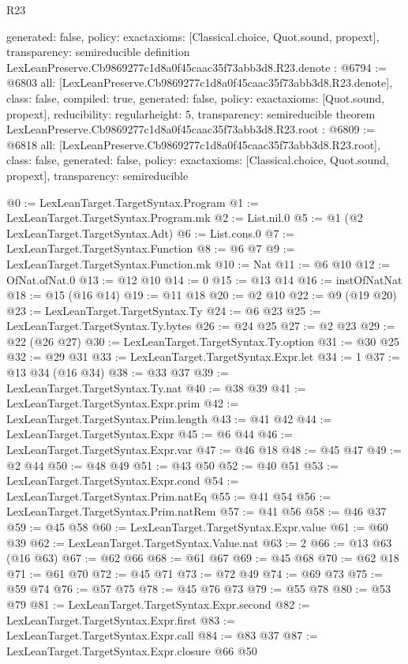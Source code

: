 \begin{lexlean}{R23}
\begin{coremodule}
{  generated: false,
  policy: exact{axioms: [Classical.choice, Quot.sound, propext]},
  transparency: semireducible
}
definition LexLeanPreserve.Cb9869277c1d8a0f45caac35f73abb3d8.R23.denote : @6794 := @6803 {
  all: [LexLeanPreserve.Cb9869277c1d8a0f45caac35f73abb3d8.R23.denote],
  class: false,
  compiled: true,
  generated: false,
  policy: exact{axioms: [Quot.sound, propext]},
  reducibility: regular{height: 5},
  transparency: semireducible
}
theorem LexLeanPreserve.Cb9869277c1d8a0f45caac35f73abb3d8.R23.root : @6809 := @6818 {
  all: [LexLeanPreserve.Cb9869277c1d8a0f45caac35f73abb3d8.R23.root],
  class: false,
  generated: false,
  policy: exact{axioms: [Classical.choice, Quot.sound, propext]},
  transparency: semireducible
}

@0 := LexLeanTarget.TargetSyntax.Program
@1 := LexLeanTarget.TargetSyntax.Program.mk
@2 := List.nil.{0}
@5 := @1 (@2 LexLeanTarget.TargetSyntax.Adt)
@6 := List.cons.{0}
@7 := LexLeanTarget.TargetSyntax.Function
@8 := @6 @7
@9 := LexLeanTarget.TargetSyntax.Function.mk
@10 := Nat
@11 := @6 @10
@12 := OfNat.ofNat.{0}
@13 := @12 @10
@14 := 0
@15 := @13 @14
@16 := instOfNatNat
@18 := @15 (@16 @14)
@19 := @11 @18
@20 := @2 @10
@22 := @9 (@19 @20)
@23 := LexLeanTarget.TargetSyntax.Ty
@24 := @6 @23
@25 := LexLeanTarget.TargetSyntax.Ty.bytes
@26 := @24 @25
@27 := @2 @23
@29 := @22 (@26 @27)
@30 := LexLeanTarget.TargetSyntax.Ty.option
@31 := @30 @25
@32 := @29 @31
@33 := LexLeanTarget.TargetSyntax.Expr.let
@34 := 1
@37 := @13 @34 (@16 @34)
@38 := @33 @37
@39 := LexLeanTarget.TargetSyntax.Ty.nat
@40 := @38 @39
@41 := LexLeanTarget.TargetSyntax.Expr.prim
@42 := LexLeanTarget.TargetSyntax.Prim.length
@43 := @41 @42
@44 := LexLeanTarget.TargetSyntax.Expr
@45 := @6 @44
@46 := LexLeanTarget.TargetSyntax.Expr.var
@47 := @46 @18
@48 := @45 @47
@49 := @2 @44
@50 := @48 @49
@51 := @43 @50
@52 := @40 @51
@53 := LexLeanTarget.TargetSyntax.Expr.cond
@54 := LexLeanTarget.TargetSyntax.Prim.natEq
@55 := @41 @54
@56 := LexLeanTarget.TargetSyntax.Prim.natRem
@57 := @41 @56
@58 := @46 @37
@59 := @45 @58
@60 := LexLeanTarget.TargetSyntax.Expr.value
@61 := @60 @39
@62 := LexLeanTarget.TargetSyntax.Value.nat
@63 := 2
@66 := @13 @63 (@16 @63)
@67 := @62 @66
@68 := @61 @67
@69 := @45 @68
@70 := @62 @18
@71 := @61 @70
@72 := @45 @71
@73 := @72 @49
@74 := @69 @73
@75 := @59 @74
@76 := @57 @75
@78 := @45 @76 @73
@79 := @55 @78
@80 := @53 @79
@81 := LexLeanTarget.TargetSyntax.Expr.second
@82 := LexLeanTarget.TargetSyntax.Expr.first
@83 := LexLeanTarget.TargetSyntax.Expr.call
@84 := @83 @37
@87 := LexLeanTarget.TargetSyntax.Expr.closure @66 @50

\end{coremodule}
\end{lexlean}
